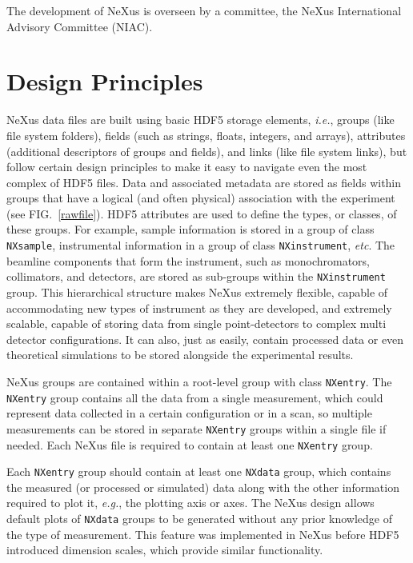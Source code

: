 \documentclass[%
 aip,
rsi,
 amsmath,amssymb,
 reprint,%
]{revtex4-1}
\begin{document}
The development of NeXus is overseen by a committee, the NeXus International Advisory Committee (NIAC)\cite{niac}.

\section{Design Principles}

NeXus data files are built using basic HDF5 storage elements, \emph{i.e.}, groups (like file system folders), fields (such as strings, floats, integers, and arrays), 
attributes (additional descriptors of groups and fields), and links (like file system links), but follow certain design principles to make it easy to navigate even the 
most complex of HDF5 files. Data and associated
metadata are stored as fields within groups that have a logical (and often physical) association with the experiment (see FIG.~\ref{rawfile}). 
HDF5 attributes are  used to define the types, or classes, of these groups. For example, sample information is stored in a group of class \texttt{NXsample}, 
instrumental information in a group of class \texttt{NXinstrument}, \emph{etc}. The beamline components that form the instrument,
such as monochromators, collimators, and detectors, are stored as sub-groups within the \texttt{NXinstrument} group. This
hierarchical structure makes NeXus extremely flexible, capable of accommodating new types of instrument as they are developed, 
and extremely scalable, capable of storing data from single point-detectors to complex multi detector configurations. It can also, 
just as easily, contain processed data or even theoretical simulations to be stored alongside the experimental results. 

NeXus groups are contained within a root-level group with class \texttt{NXentry}. The \texttt{NXentry} group contains all the data from a single measurement, 
which could represent data collected in a certain configuration or in a scan, so multiple measurements can be stored in separate \texttt{NXentry} 
groups within a single file if needed. Each NeXus file is required to contain at least one \texttt{NXentry} group. 

Each \texttt{NXentry} group should
contain at least one \texttt{NXdata} group, which contains the measured (or processed or simulated) data along with the other information required to plot it, 
\emph{e.g.}, the plotting axis or axes. The NeXus design allows default plots of \texttt{NXdata} groups to be generated without any prior knowledge of the
type of measurement. This feature was implemented in NeXus before HDF5 introduced dimension scales, which provide similar functionality. 
\end{document}
